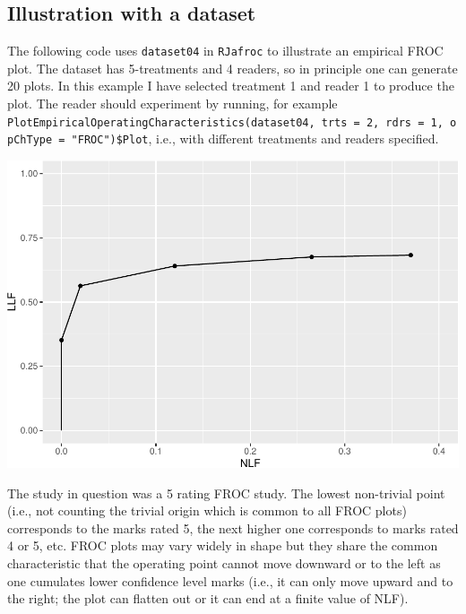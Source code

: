 \documentclass[
]{book}
\newenvironment{Shaded}{\begin{snugshade}}{\end{snugshade}}
\newcommand{\DataTypeTok}[1]{\textcolor[rgb]{0.13,0.29,0.53}{#1}}
\newcommand{\DecValTok}[1]{\textcolor[rgb]{0.00,0.00,0.81}{#1}}
\newcommand{\KeywordTok}[1]{\textcolor[rgb]{0.13,0.29,0.53}{\textbf{#1}}}
\newcommand{\NormalTok}[1]{#1}
\newcommand{\OperatorTok}[1]{\textcolor[rgb]{0.81,0.36,0.00}{\textbf{#1}}}
\newcommand{\StringTok}[1]{\textcolor[rgb]{0.31,0.60,0.02}{#1}}
\begin{document}
\hypertarget{froc-paradigm-plot-illustration}{%
\subsection{Illustration with a dataset}\label{froc-paradigm-plot-illustration}}

The following code uses \texttt{dataset04} \citep{zanca2009evaluation} in \texttt{RJafroc} to illustrate an empirical FROC plot. The dataset has 5-treatments and 4 readers, so in principle one can generate 20 plots. In this example I have selected treatment 1 and reader 1 to produce the plot. The reader should experiment by running, for example \texttt{PlotEmpiricalOperatingCharacteristics(dataset04,\ trts\ =\ 2,\ rdrs\ =\ 1,\ opChType\ =\ "FROC")\$Plot}, i.e., with different treatments and readers specified.

\begin{Shaded}
\end{Shaded}

\includegraphics{02-froc_files/figure-latex/unnamed-chunk-1-1.pdf}

The study in question was a 5 rating FROC study. The lowest non-trivial point (i.e., not counting the trivial origin which is common to all FROC plots) corresponds to the marks rated 5, the next higher one corresponds to marks rated 4 or 5, etc. FROC plots may vary widely in shape but they share the common characteristic that the operating point cannot move downward or to the left as one cumulates lower confidence level marks (i.e., it can only move upward and to the right; the plot can flatten out or it can end at a finite value of NLF).
\end{document}

